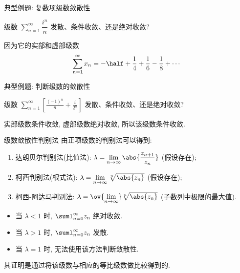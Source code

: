 \begin{frame}{典型例题: 复数项级数敛散性}
	\onslide<+->
	\begin{example}
		级数 $\displaystyle\sum_{n=1}^\infty\dfrac{i^n}n$ 发散、条件收敛、还是绝对收敛?
	\end{example}

	\onslide<+->
	\begin{solution}
		因为它的实部和虚部级数
		\[\sum_{n=1}^\infty x_n=-\half +\frac14+\frac16-\frac18+\cdots\]
	\onslide<+->{所以原级数条件收敛.}
	\end{solution}
\end{frame}


\begin{frame}{典型例题: 判断级数的敛散性}
	\onslide<+->
	\begin{exercise}
		级数 $\displaystyle\sum_{n=1}^\infty\left[\frac{(-1)^n}n+\frac i{2^n}\right]$ 发散、条件收敛、还是绝对收敛?
	\end{exercise}

	\onslide<+->
	\begin{answer}
		实部级数条件收敛, 虚部级数绝对收敛, 所以该级数条件收敛.
	\end{answer}
\end{frame}


\begin{frame}{级数敛散性判别法}
	由正项级数的判别法可以得到:
	\onslide<+->
	\begin{enumerate}
		\item \alert{达朗贝尔判别法(比值法)}: $\lambda=\displaystyle\lim_{n\to\infty}\abs{\frac{z_{n+1}}{z_n}}$ (假设存在);
		\item 柯西判别法(根式法): $\lambda=\displaystyle\lim_{n\to\infty}\sqrt[n]{\abs{z_n}}$ (假设存在);
		\item 柯西-阿达马判别法: $\lambda=\displaystyle\ov{\lim_{n\to\infty}}\sqrt[n]{\abs{z_n}}$ (子数列中极限的最大值).
	\end{enumerate}

	\begin{itemize}
		\item 当 $\lambda<1$ 时, $\suml_{n=0}^\infty z_n$ 绝对收敛.
		\item 当 $\lambda>1$ 时, $\suml_{n=0}^\infty z_n$ 发散.
		\item 当 $\lambda=1$ 时, 无法使用该方法判断敛散性.
	\end{itemize}
	\onslide<+->
	其证明是通过将该级数与相应的等比级数做比较得到的.
\end{frame}


